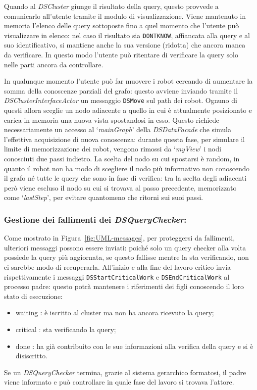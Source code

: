 Quando al \emph{DSCluster} giunge il risultato della query,
questo provvede a comunicarlo all'utente tramite il modulo di
visualizzazione. Viene mantenuto in memoria l'elenco delle
query sottoposte fino a quel momento che l'utente può visualizzare
in elenco: nel caso il risultato sia \texttt{DONTKNOW}, affiancata
alla query e al suo identificativo, si mantiene anche la sua versione
(ridotta) che ancora manca da verificare. In questo modo
l'utente può ritentare di verificare la query solo nelle parti
ancora da controllare.

In qualunque momento l'utente può far muovere i robot cercando di
aumentare la somma della conoscenze parziali del grafo: questo
avviene inviando tramite il \emph{DSClusterInterfaceActor} un
messaggio \texttt{DSMove} sul path dei robot.
Ognuno di questi allora sceglie un nodo adiacente
a quello in cui è attualmente posizionato e carica in memoria
una nuova vista spostandosi in esso.
Questo richiede necessariamente un accesso al `\emph{mainGraph}' della
\emph{DSDataFacade} che simula l'effettiva acquisizione di
nuova conoscenza: durante questa fase, per simulare il limite di
memorizzazione dei robot, vengono rimossi da `\emph{myView}'
i nodi conosciuti due passi indietro.
La scelta del nodo su cui spostarsi è random, in quanto il robot
non ha modo di scegliere il nodo più informativo non conoscendo
il grafo né tutte le query che sono in fase di verifica:
tra la scelta degli adiacenti però viene escluso il nodo su cui
si trovava al passo precedente, memorizzato come
`\emph{lastStep}', per evitare quantomeno che ritorni sui suoi passi.

\subsubsection*{Gestione dei fallimenti dei \emph{DSQueryChecker}:}
Come mostrato in Figura~\ref{fig:UML-messages},
per proteggersi da fallimenti, ulteriori messaggi possono essere
inviati: poiché solo un query checker alla volta possiede la query
più aggiornata, se questo fallisse mentre la sta verificando,
non ci sarebbe modo di recuperarla.
All'inizio e alla fine del lavoro critico invia rispettivamente i
messaggi \texttt{DSStartCriticalWork} e \texttt{DSEndCriticalWork}
al processo padre: questo potrà mantenere i riferimenti dei
figli conoscendo il loro stato di esecuzione:\begin{itemize}
\item waiting : è iscritto al cluster ma non ha ancora ricevuto la query;
\item critical : sta verificando la query;
\item done : ha già contribuito con le sue informazioni alla verifica
  della query e si è disiscritto.
\end{itemize}
Se un \emph{DSQueryChecker} termina, grazie al sistema gerarchico
formatosi, il padre viene informato e può controllare in quale fase del
lavoro si trovava l'attore.

